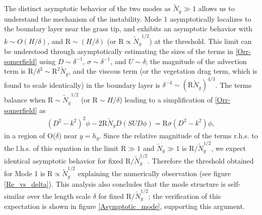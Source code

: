 \documentclass[aps,prl,twocolumn,superscriptaddress,10pt]{revtex4-1}  %
\newcommand{\hg}{h_g}
\newcommand{\Rey}{\text{R}}
\newcommand{\Ndg}{\tilde{N}_g}
\begin{document}
The distinct asymptotic behavior of the two modes as $\Ndg \gg 1$ allows us to understand the mechanism of the instability. 
Mode 1 asymptotically localizes to the boundary layer near the grass tip, and exhibits an asymptotic behavior with $k \sim O(H/\delta)$, and $\Rey \sim (H/\delta)$ (or $\Rey \propto {\Ndg}^{1/2}$) at the threshold. 
This limit can be understood through asymptotically estimating the sizes of the terms in \eqref{Orr-somerfield} using $D\sim \delta^{-1}$, $\sigma \sim \delta^{-1}$, and $U\sim \delta$; the magnitude of the advection term is $\Rey/\delta^3 \sim \Rey^2 \Ndg $, and the viscous term (or the vegetation drag term, which is found to scale identically) in the boundary layer is $\delta^{-4} \sim (\Rey \Ndg)^{4/3}$. 
The terms balance when $\Rey \sim {\Ndg}^{1/2}$ (or $\Rey \sim H/\delta$) leading to a simplification of \eqref{Orr-somerfield} as
\begin{align}
(D^2-k^2)^2 \phi- 2 \Rey \Ndg D( SUD\phi) = \Rey \sigma (D^2-k^2)\phi,
\end{align} 
in a region of O($\delta$) near $y=\hg$.
Since the relative magnitude of the terms r.h.s. to the l.h.s. of this equation in the limit $\Rey \gg 1$ and $\Ndg \gg 1$ is $\Rey/\Ndg^{1/2}$, we expect identical asymptotic behavior for fixed $\Rey/\Ndg^{1/2}$. Therefore the threshold obtained for Mode 1 is $\Rey \propto \Ndg^{1/2}$ explaining the numerically observation (see figure \ref{Re_vs_delta}). 
This analysis also concludes that the mode structure is self-similar over the length scale $\delta$ for fixed $\Rey/\Ndg^{1/2}$; the verification of this expectation is shown in figure \ref{Asymptotic_mode}, supporting this argument.
\end{document}
